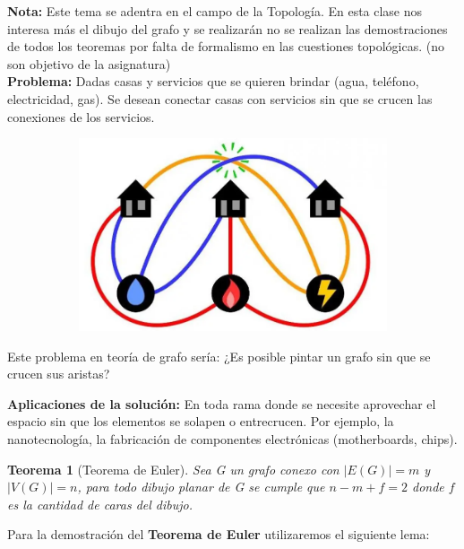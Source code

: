 \documentclass[a4paper,1pt]{report}
\newtheorem*{teo}{Teorema}
\begin{document}
\textbf{Nota:} Este tema se adentra en el campo de la Topología. En esta clase nos interesa más el dibujo del grafo y se
realizarán no se realizan las demostraciones de todos los teoremas por falta de formalismo en las cuestiones topológicas. (no son objetivo de la asignatura)\\


\textbf{Problema:} Dadas casas y servicios que se quieren brindar (agua, teléfono, electricidad, gas). Se desean
conectar casas con servicios sin que se crucen las conexiones de los servicios.


\begin{figure}[H]
    \centering
    \begin{subfigure}[b]{0.45\textwidth}
        \centering
        \includegraphics[width=\textwidth]{figures5/services.png}
    \end{subfigure}
\end{figure} 

Este problema en teoría de grafo sería: ¿Es posible pintar un grafo sin que se crucen sus aristas?


\textbf{Aplicaciones de la solución:} En toda rama donde se necesite aprovechar el espacio sin que los elementos se
solapen o entrecrucen. Por ejemplo, la nanotecnología, la fabricación de componentes electrónicas
(motherboards, chips).

\begin{teo}[Teorema de Euler]
Sea G un grafo conexo con $|E(G)|=m$  y $|V(G)|=n$, para todo dibujo planar de G se cumple que $n-m+f=2$ donde $f$ es la cantidad de caras del dibujo.
\end{teo}

Para la demostración del \textbf{Teorema de Euler} utilizaremos el siguiente lema:
\end{document}
